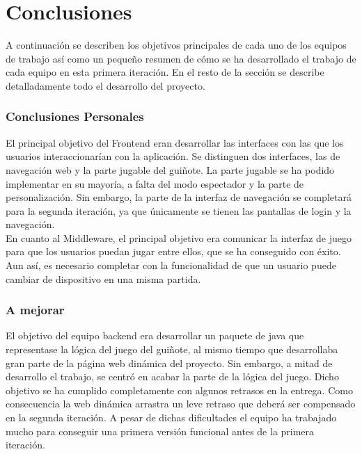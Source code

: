 \section{Conclusiones}
\label{conclusiones}
A continuación se describen los objetivos principales de cada uno de los equipos de trabajo así como un pequeño resumen de cómo se ha desarrollado el trabajo de cada equipo en esta primera iteración. En el resto de la sección se describe detalladamente todo el desarrollo del proyecto.\\

\subsubsection*{Conclusiones Personales}
El principal objetivo del Frontend eran desarrollar las interfaces con las que los usuarios interaccionarían con la aplicación. Se distinguen dos interfaces, las de navegación web y la parte jugable del guiñote. La parte jugable se ha podido implementar en su mayoría, a falta del modo espectador y la parte de personalización. Sin embargo, la parte de la interfaz de navegación se completará para la segunda iteración, ya que únicamente se tienen las pantallas de login y la navegación.
\\
En cuanto al Middleware, el principal objetivo era comunicar la interfaz de juego para que los usuarios puedan jugar entre ellos, que se ha conseguido con éxito. Aun así, es necesario completar con la funcionalidad de que un usuario puede cambiar de dispositivo en una misma partida.

\subsubsection*{A mejorar}
El objetivo del equipo backend era desarrollar un paquete de java que representase la lógica del juego del guiñote, al mismo tiempo que desarrollaba gran parte de la página web dinámica del proyecto. Sin embargo, a mitad de desarrollo el trabajo, se centró en acabar la parte de la lógica del juego. Dicho objetivo se ha cumplido completamente con algunos retrasos en la entrega. Como consecuencia la web dinámica arrastra un leve retraso que deberá ser compensado en la segunda iteración. A pesar de dichas dificultades el equipo ha trabajado mucho para conseguir una primera versión funcional antes de la primera iteración.
